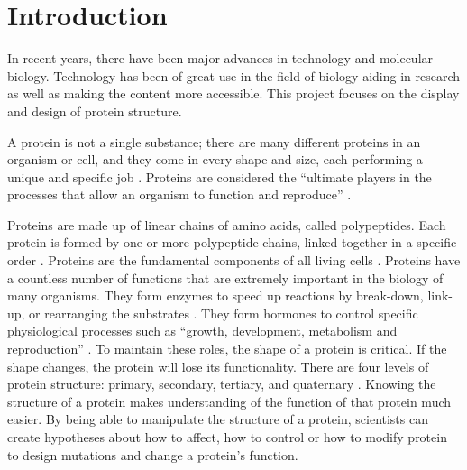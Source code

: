 \chapter{Introduction}
\label{ch:intro}

In recent years, there have been major advances in technology and molecular biology. Technology has been of great use in the field of biology aiding in research as well as making the content more accessible. This project focuses on the display and design of protein structure.

A protein is not a single substance; there are many different proteins in an organism or cell, and they come in every shape and size, each performing a unique and specific job \parencite{noauthor_introduction_nodate}. Proteins are considered the ``ultimate players in the processes that allow an organism to function and reproduce'' \parencite{stephenson_protein_2016}.

Proteins are made up of linear chains of amino acids, called polypeptides. Each protein is formed by one or more polypeptide chains, linked together in a specific order \parencite{noauthor_introduction_nodate}. Proteins are the fundamental components of all living cells \parencite{hutchison_protein_2013}. Proteins have a countless number of functions that are extremely important in the biology of many organisms. They form enzymes to speed up reactions by break-down, link-up, or rearranging the substrates \parencite{noauthor_introduction_nodate}. They form hormones to control specific physiological processes such as ``growth, development, metabolism and reproduction'' \parencite{noauthor_introduction_nodate}. To maintain these roles, the shape of a protein is critical. If the shape changes, the protein will lose its functionality. There are four levels of protein structure: primary, secondary, tertiary, and quaternary \parencite{noauthor_introduction_nodate}.
Knowing the structure of a protein makes understanding of the function of that protein much easier. By being able to manipulate the structure of a protein, scientists can create hypotheses about how to affect, how to control or how to modify protein to design mutations and change a protein's function. 

